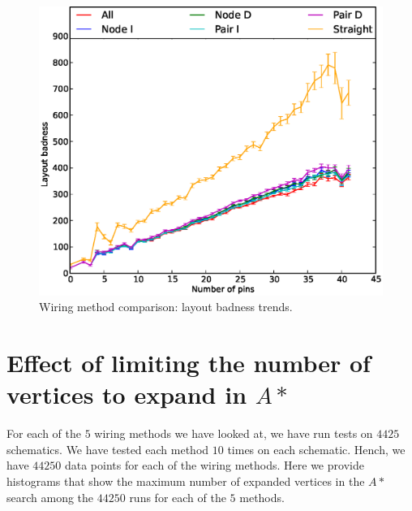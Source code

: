 \begin{figure}[H]
\begin{center}
\includegraphics[width=\textwidth]{Images/wiring_badness_trend_comparison.eps}
\caption{Wiring method comparison: layout badness trends.}
\label{fig:wiring_badness_trend}
\end{center}
\end{figure}

\section{Effect of limiting the number of vertices to expand in $A*$}
\label{sec:expand_limit}

For each of the $5$ wiring methods we have looked at, we have run tests on $4425$
schematics. We have tested each method $10$ times on each schematic. Hench, we
have $44250$ data points for each of the wiring methods. Here we provide
histograms that show the maximum number of expanded vertices in the $A*$ search
among the $44250$ runs for each of the $5$ methods.

